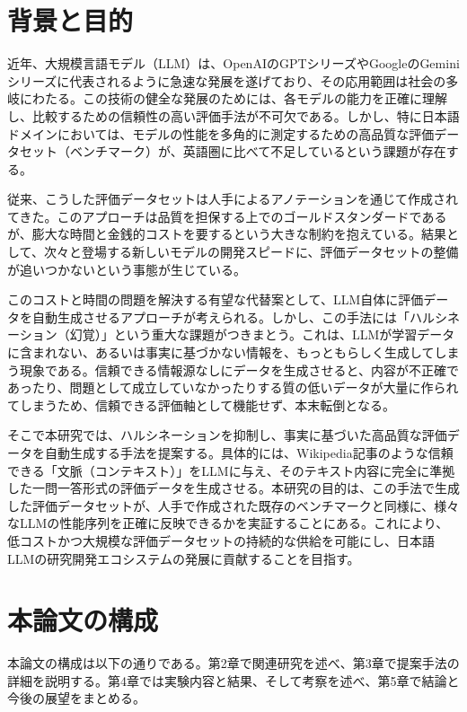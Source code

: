 \documentclass[a4paper,11pt]{jreport}
\begin{document}
\section{背景と目的}
近年、大規模言語モデル（LLM）は、OpenAIのGPTシリーズ\cite{GPT-3}やGoogleのGeminiシリーズに代表されるように急速な発展を遂げており、その応用範囲は社会の多岐にわたる。この技術の健全な発展のためには、各モデルの能力を正確に理解し、比較するための信頼性の高い評価手法が不可欠である。しかし、特に日本語ドメインにおいては、モデルの性能を多角的に測定するための高品質な評価データセット（ベンチマーク）が、英語圏に比べて不足しているという課題が存在する\cite{Okazaki:COLM2024}。

従来、こうした評価データセットは人手によるアノテーションを通じて作成されてきた。このアプローチは品質を担保する上でのゴールドスタンダードであるが、膨大な時間と金銭的コストを要するという大きな制約を抱えている。結果として、次々と登場する新しいモデルの開発スピードに、評価データセットの整備が追いつかないという事態が生じている。

このコストと時間の問題を解決する有望な代替案として、LLM自体に評価データを自動生成させるアプローチが考えられる。しかし、この手法には「ハルシネーション（幻覚）」という重大な課題がつきまとう。これは、LLMが学習データに含まれない、あるいは事実に基づかない情報を、もっともらしく生成してしまう現象である。信頼できる情報源なしにデータを生成させると、内容が不正確であったり、問題として成立していなかったりする質の低いデータが大量に作られてしまうため、信頼できる評価軸として機能せず、本末転倒となる。

そこで本研究では、ハルシネーションを抑制し、事実に基づいた高品質な評価データを自動生成する手法を提案する。具体的には、Wikipedia記事のような信頼できる「文脈（コンテキスト）」をLLMに与え、そのテキスト内容に完全に準拠した一問一答形式の評価データを生成させる。本研究の目的は、この手法で生成した評価データセットが、人手で作成された既存のベンチマークと同様に、様々なLLMの性能序列を正確に反映できるかを実証することにある。これにより、低コストかつ大規模な評価データセットの持続的な供給を可能にし、日本語LLMの研究開発エコシステムの発展に貢献することを目指す。

\section{本論文の構成}

本論文の構成は以下の通りである。第2章で関連研究を述べ、第3章で提案手法の詳細を説明する。第4章では実験内容と結果、そして考察を述べ、第5章で結論と今後の展望をまとめる。
\end{document}
